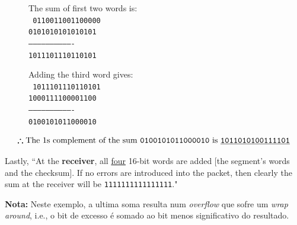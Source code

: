 \begin{figure}[H]
    \centering
    \begin{minipage}{0.45\linewidth}%
        \begin{center}
        The sum of first two words is: \\[6pt]
        
        \texttt{%
            0110011001100000 \\
            0101010101010101 \\
            ------------------------------- \\
            1011101110110101
        }
        \end{center}
    \end{minipage}
    \raisebox{0.25em}{$\pmb{\rightarrow}$}
    \begin{minipage}{0.45\linewidth}%
        \begin{center}
        Adding the third word gives: \\[6pt]
        
        \texttt{%
            1011101110110101 \\
            1000111100001100 \\
            ------------------------------- \\
            0100101011000010
        }
        \end{center}
    \end{minipage}
    \label{fig:checksum}
\end{figure}

\vspace{-1.25
em}
$$
   \pmb{\therefore} \text{The 1s complement of the sum \texttt{0100101011000010} is \underline{\texttt{1011010100111101}}}
$$

\noindent Lastly, ``At the \textbf{receiver}, all \underline{four} 16-bit words are added $[$the segment's words and the checksum$]$. If no errors are introduced into the packet, then clearly the sum at the receiver will be \texttt{1111111111111111}."\cite{Kurose2017}

\vspace{0.75em}
\noindent \textbf{Nota:} Neste exemplo, a ultima soma resulta num \textit{overflow} que sofre um \textit{wrap around}, i.e., o bit de excesso é somado ao bit menos significativo do resultado. 
